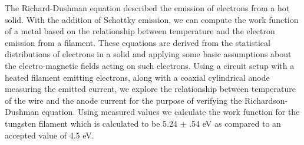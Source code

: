 The Richard-Dushman equation described the emission of electrons from a hot solid. With the addition of Schottky emission, we can compute the work function of a metal based on the relationship between temperature and the electron emission from a filament. These equations are derived from the statistical distributions of electrons in a solid and applying some basic assumptions about the electro-magnetic fields acting on such electrons. Using a circuit setup with a heated filament emitting electrons, along with a coaxial cylindrical anode measuring the emitted current, we explore the relationship between temperature of the wire and the anode current for the purpose of verifying the Richardson-Dushman equation. Using measured values we calculate the work function for the tungsten filament which is calculated to be 5.24 $\pm$ .54 eV as compared to an accepted value of 4.5 eV.